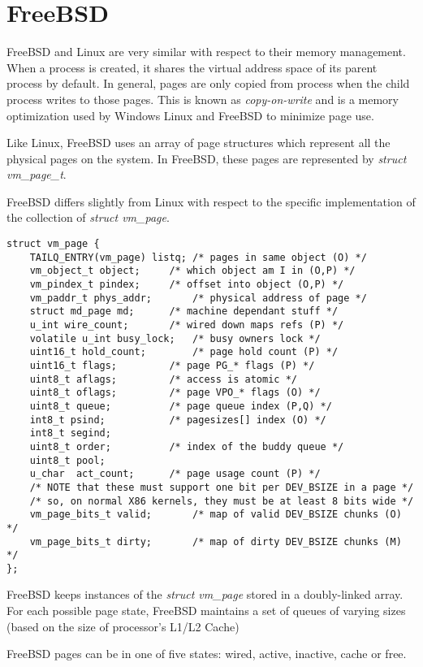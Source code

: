 \documentclass[onecolumn,10pt]{IEEETran}
\begin{document}
\section{FreeBSD}

	FreeBSD and Linux are very similar with respect to their memory management.  When a process is created, it shares the virtual address space of its parent process by default.  In general, pages are only copied from process when the child process writes to those pages.  This is known as \textit{copy-on-write} and is a memory optimization used by Windows Linux and FreeBSD to minimize page use.

Like Linux, FreeBSD uses an array of page structures which represent all the physical pages on the system.  In FreeBSD, these pages are represented by \textit{struct vm\_page\_t}.  

FreeBSD differs slightly from Linux with respect to the specific implementation of the collection of \textit{struct vm\_page}.  

\begin{lstlisting}
struct vm_page {
	TAILQ_ENTRY(vm_page) listq;	/* pages in same object (O) */
	vm_object_t object;		/* which object am I in (O,P) */
	vm_pindex_t pindex;		/* offset into object (O,P) */
	vm_paddr_t phys_addr;		/* physical address of page */
	struct md_page md;		/* machine dependant stuff */
	u_int wire_count;		/* wired down maps refs (P) */
	volatile u_int busy_lock;	/* busy owners lock */
	uint16_t hold_count;		/* page hold count (P) */
	uint16_t flags;			/* page PG_* flags (P) */
	uint8_t aflags;			/* access is atomic */
	uint8_t oflags;			/* page VPO_* flags (O) */
	uint8_t	queue;			/* page queue index (P,Q) */
	int8_t psind;			/* pagesizes[] index (O) */
	int8_t segind;
	uint8_t	order;			/* index of the buddy queue */
	uint8_t pool;
	u_char	act_count;		/* page usage count (P) */
	/* NOTE that these must support one bit per DEV_BSIZE in a page */
	/* so, on normal X86 kernels, they must be at least 8 bits wide */
	vm_page_bits_t valid;		/* map of valid DEV_BSIZE chunks (O) */
	vm_page_bits_t dirty;		/* map of dirty DEV_BSIZE chunks (M) */
};
\end{lstlisting}

FreeBSD keeps instances of the \textit{struct vm\_page} stored in a doubly-linked array.  For each possible page state, FreeBSD maintains a set of queues of varying sizes (based on the size of processor's L1/L2 Cache)

FreeBSD pages can be in one of five states: wired, active, inactive, cache or free.
\end{document}

